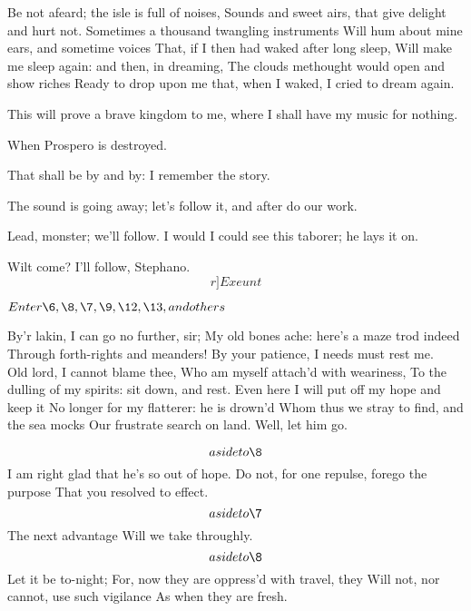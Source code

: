 \documentclass[11pt]{book}
\begin{document}
\5	Be not afeard; the isle is full of noises,
	Sounds and sweet airs, that give delight and hurt not.
	Sometimes a thousand twangling instruments
	Will hum about mine ears, and sometime voices
	That, if I then had waked after long sleep,
	Will make me sleep again: and then, in dreaming,
	The clouds methought would open and show riches
	Ready to drop upon me that, when I waked,
	I cried to dream again.

\begin{PROSE}

	This will prove a brave kingdom to me, where I shall
	have my music for nothing.

\5	When Prospero is destroyed.

	That shall be by and by: I remember the story.

	The sound is going away; let's follow it, and
	after do our work.

	Lead, monster; we'll follow. I would I could see
	this taborer; he lays it on.

	Wilt come? I'll follow, Stephano. \[r]Exeunt\]

\end{PROSE}


   \(Enter \6, \8, \7, \9, \12, \13, and others\)

\9	By'r lakin, I can go no further, sir;
	My old bones ache: here's a maze trod indeed
	Through forth-rights and meanders! By your patience,
	I needs must rest me. \\

\6	Old lord, I cannot blame thee,
	Who am myself attach'd with weariness,
	To the dulling of my spirits: sit down, and rest.
	Even here I will put off my hope and keep it
	No longer for my flatterer: he is drown'd
	Whom thus we stray to find, and the sea mocks
	Our frustrate search on land. Well, let him go.

\7	\[aside to \8\] I am right glad that he's so out of hope.
	Do not, for one repulse, forego the purpose
	That you resolved to effect. \\

\8	\[aside to \7\] The next advantage
	Will we take throughly. \\

\7	\[aside to \8\]  Let it be to-night;
	For, now they are oppress'd with travel, they
	Will not, nor cannot, use such vigilance
	As when they are fresh. \\
\end{document}
